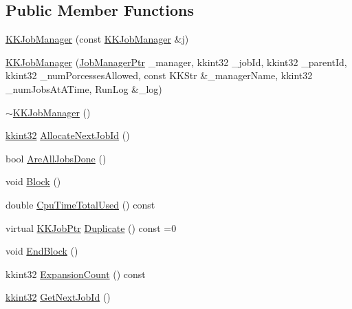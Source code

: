 \subsection*{Public Member Functions}
\begin{DoxyCompactItemize}
\item 
\hyperlink{class_k_k_job_managment_1_1_k_k_job_manager_a369051df330b5adb46c6495b579eb14f}{K\+K\+Job\+Manager} (const \hyperlink{class_k_k_job_managment_1_1_k_k_job_manager}{K\+K\+Job\+Manager} \&j)
\item 
\hyperlink{class_k_k_job_managment_1_1_k_k_job_manager_adb6e814b7412f31c68b1b9ef05154018}{K\+K\+Job\+Manager} (\hyperlink{class_k_k_job_managment_1_1_k_k_job_manager_a3e186b42e759f71ceb6f3d04f4e8f74d}{Job\+Manager\+Ptr} \+\_\+manager, kkint32 \+\_\+job\+Id, kkint32 \+\_\+parent\+Id, kkint32 \+\_\+num\+Porcesses\+Allowed, const K\+K\+Str \&\+\_\+manager\+Name, kkint32 \+\_\+num\+Jobs\+At\+A\+Time, Run\+Log \&\+\_\+log)
\item 
\hyperlink{class_k_k_job_managment_1_1_k_k_job_manager_a3bbb1596df4930b5983581c1d362931b}{$\sim$\+K\+K\+Job\+Manager} ()
\item 
\hyperlink{namespace_k_k_b_a8fa4952cc84fda1de4bec1fbdd8d5b1b}{kkint32} \hyperlink{class_k_k_job_managment_1_1_k_k_job_manager_acde0b398be77876742330ed8fa28b892}{Allocate\+Next\+Job\+Id} ()
\item 
bool \hyperlink{class_k_k_job_managment_1_1_k_k_job_manager_a0795aa3bba19acdd8d273337a4ebda54}{Are\+All\+Jobs\+Done} ()
\item 
void \hyperlink{class_k_k_job_managment_1_1_k_k_job_manager_a17df59c24c81a70cc28a47388db1eaf1}{Block} ()
\item 
double \hyperlink{class_k_k_job_managment_1_1_k_k_job_manager_a1bf2466bc4525b77e3b369886ef9c0e8}{Cpu\+Time\+Total\+Used} () const 
\item 
virtual \hyperlink{class_k_k_job_managment_1_1_k_k_job_a53526e4ffe4ab2b7858f79ab0ed65a1d}{K\+K\+Job\+Ptr} \hyperlink{class_k_k_job_managment_1_1_k_k_job_manager_ab5f0de9fb1b082c657eed9c404d118f0}{Duplicate} () const  =0
\item 
void \hyperlink{class_k_k_job_managment_1_1_k_k_job_manager_a9c6db18d27dbd4cd8f1801c47339f0eb}{End\+Block} ()
\item 
kkint32 \hyperlink{class_k_k_job_managment_1_1_k_k_job_manager_a04d30ed40591dcca1b9f141fe0abc24d}{Expansion\+Count} () const 
\item 
\hyperlink{namespace_k_k_b_a8fa4952cc84fda1de4bec1fbdd8d5b1b}{kkint32} \hyperlink{class_k_k_job_managment_1_1_k_k_job_manager_a56089b2bf3926c1cdf5f5db2f7fa4170}{Get\+Next\+Job\+Id} ()

\end{DoxyCompactItemize}
